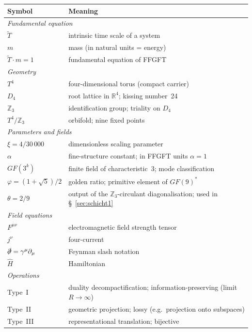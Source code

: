 \medskip
\begin{tabular}{@{}lp{11cm}@{}}
\toprule
\textbf{Symbol} & \textbf{Meaning} \\
\midrule
\multicolumn{2}{l}{\textit{Fundamental equation}} \\
$\tilde{T}$ & intrinsic time scale of a system \\
$m$ & mass (in natural units = energy) \\
$\tilde{T}\cdot m=1$ & fundamental equation of FFGFT \\
\midrule
\multicolumn{2}{l}{\textit{Geometry}} \\
$T^4$ & four-dimensional torus (compact carrier) \\
$D_4$ & root lattice in $\mathbb{R}^4$; kissing number~24 \\
$\mathbb{Z}_3$ & identification group; triality on $D_4$ \\
$T^4/\mathbb{Z}_3$ & orbifold; nine fixed points \\
\midrule
\multicolumn{2}{l}{\textit{Parameters and fields}} \\
$\xi=4/30\,000$ & dimensionless scaling parameter \\
$\alpha$ & fine-structure constant; in FFGFT units $\alpha=1$ \\
$GF(3^k)$ & finite field of characteristic~3; mode classification \\
$\varphi=(1{+}\sqrt5)/2$ & golden ratio; primitive element of $GF(9)^*$ \\
$\theta=2/9$ & output of the $\mathbb{Z}_3$-circulant diagonalisation; used in §~\ref{sec:schicht1} \\
\midrule
\multicolumn{2}{l}{\textit{Field equations}} \\
$F^{\mu\nu}$ & electromagnetic field strength tensor \\
$j^\nu$ & four-current \\
$\slashed\partial=\gamma^\mu\partial_\mu$ & Feynman slash notation \\
$\hat{H}$ & Hamiltonian \\
\midrule
\multicolumn{2}{l}{\textit{Operations}} \\
Type~I & duality decompactification; information-preserving (limit $R\to\infty$) \\
Type~II & geometric projection; lossy (e.g.\ projection onto subspaces) \\
Type~III & representational translation; bijective \\
\bottomrule
\end{tabular}


